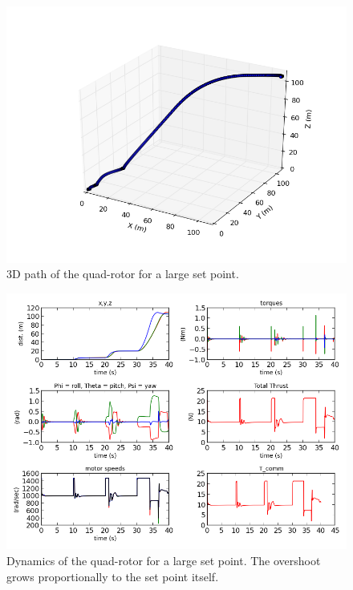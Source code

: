 \begin{figure}[htbp]
	\centering
		\includegraphics[scale = 0.4]{Figures/largeSetpointDifferencesTest_3d.png}
	\caption[Large Set Points 3D Path]{3D path of the quad-rotor for a large set point.}
	\label{fig:Large Setpoints 3D Path}
\end{figure}
\begin{figure}[htbp]
	\centering
		\includegraphics[scale = 0.5]{Figures/largeSetpointDifferencesTest_timedomain.png}
	\caption[Large Set Point Time Domain]{Dynamics of the quad-rotor for a large set point. The overshoot grows proportionally to the set point itself. }
	\label{fig:Large Setpoint Time Domain}
\end{figure}





